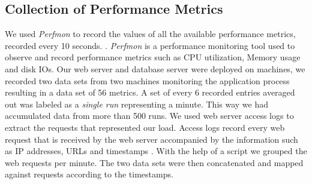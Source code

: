 \subsection{Collection of Performance Metrics}
We used \textit{Perfmon}\cite{perfmon} to record the values of all the available performance metrics, recorded every 10 seconds. \cite{windowsperfmon}\cite{perfmon}. \textit{Perfmon} is a performance monitoring tool used to observe and record performance metrics such as CPU utilization, Memory usage and disk IOs. Our web server and database server were deployed on machines, we recorded two data sets from two machines monitoring the application process resulting in a data set of 56 metrics. A set of every 6 recorded entries averaged out was labeled as a \textit{single run} representing a minute. This way we had accumulated data from more than 500 runs. We used web server access logs to extract the requests that represented our load. Access logs record every web request that is received by the web server accompanied by the information such as IP addresses, URLs and timestamps \cite{weinberg2003use}. With the help of a script we grouped the web requests per minute. The two data sets were then concatenated and mapped against requests according to the timestamps.



